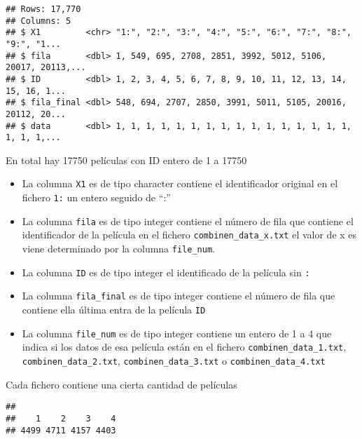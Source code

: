 \documentclass[
]{article}
\newenvironment{Shaded}{\begin{snugshade}}{\end{snugshade}}
\newcommand{\KeywordTok}[1]{\textcolor[rgb]{0.13,0.29,0.53}{\textbf{#1}}}
\newcommand{\NormalTok}[1]{#1}
\newcommand{\OperatorTok}[1]{\textcolor[rgb]{0.81,0.36,0.00}{\textbf{#1}}}
\providecommand{\tightlist}{%
  \setlength{\itemsep}{0pt}\setlength{\parskip}{0pt}}
\begin{document}
\begin{verbatim}
## Rows: 17,770
## Columns: 5
## $ X1         <chr> "1:", "2:", "3:", "4:", "5:", "6:", "7:", "8:", "9:", "1...
## $ fila       <dbl> 1, 549, 695, 2708, 2851, 3992, 5012, 5106, 20017, 20113,...
## $ ID         <dbl> 1, 2, 3, 4, 5, 6, 7, 8, 9, 10, 11, 12, 13, 14, 15, 16, 1...
## $ fila_final <dbl> 548, 694, 2707, 2850, 3991, 5011, 5105, 20016, 20112, 20...
## $ data       <dbl> 1, 1, 1, 1, 1, 1, 1, 1, 1, 1, 1, 1, 1, 1, 1, 1, 1, 1, 1,...
\end{verbatim}

En total hay 17750 películas con ID entero de 1 a 17750

\begin{itemize}
\tightlist
\item
  La columna \texttt{X1} es de tipo character contiene el identificador
  original en el fichero \texttt{1:} un entero seguido de ``:''
\item
  La columna \texttt{fila} es de tipo integer contiene el número de fila
  que contiene el identificador de la película en el fichero
  \texttt{combinen\_data\_x.txt} el valor de x es viene determinado por
  la columna \texttt{file\_num}.
\item
  La columna \texttt{ID} es de tipo integer el identificado de la
  película sin \texttt{:}
\item
  La columna \texttt{fila\_final} es de tipo integer contiene el número
  de fila que contiene ella última entra de la película \texttt{ID}
\item
  La columna \texttt{file\_num} es de tipo integer contiene un entero de
  1 a 4 que indica si los datos de esa película están en el fichero
  \texttt{combinen\_data\_1.txt}, \texttt{combinen\_data\_2.txt},
  \texttt{combinen\_data\_3.txt} o \texttt{combinen\_data\_4.txt}
\end{itemize}

Cada fichero contiene una cierta cantidad de películas

\begin{Shaded}
\end{Shaded}

\begin{verbatim}
## 
##    1    2    3    4 
## 4499 4711 4157 4403
\end{verbatim}
\end{document}
